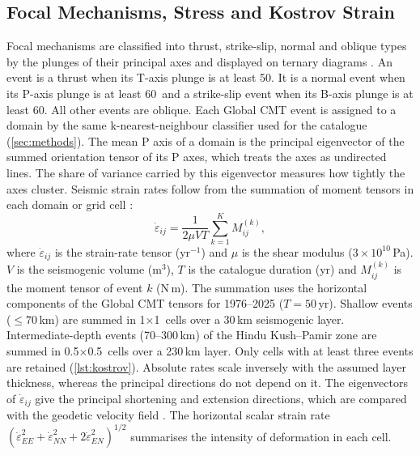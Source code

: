 \documentclass[11pt]{article}
\begin{document}
\subsection{Focal Mechanisms, Stress and Kostrov Strain}
Focal mechanisms are classified into thrust, strike-slip, normal and oblique types by
the plunges of their principal axes and displayed on ternary diagrams
\cite{Frohlich1992}. An event is a thrust when its T-axis plunge is at least
50\textdegree. It is a normal event when its P-axis plunge is at least 60\textdegree\
and a strike-slip event when its B-axis plunge is at least 60\textdegree. All other
events are oblique. Each Global CMT event is assigned to a domain by the same k-nearest-neighbour
classifier used for the catalogue (\cref{sec:methods}). The mean P axis of a domain is
the principal eigenvector of the summed orientation tensor of its P axes, which treats
the axes as undirected lines. The share of variance carried by this eigenvector
measures how tightly the axes cluster.
Seismic strain rates follow from the summation of moment tensors in each domain or
grid cell \cite{Kostrov1974, Jackson1988}:
\begin{equation}
  \dot{\varepsilon}_{ij} = \frac{1}{2\mu V T}\sum_{k=1}^{K} M_{ij}^{(k)},
  \label{eq:kostrov}
\end{equation}
where $\dot{\varepsilon}_{ij}$ is the strain-rate tensor (yr$^{-1}$) and $\mu$ is the
shear modulus ($3\times10^{10}$\,Pa). $V$ is the seismogenic volume (m$^3$), $T$ is
the catalogue duration (yr) and $M_{ij}^{(k)}$ is the moment tensor of event $k$
(N\,m). The summation uses the horizontal components of the Global CMT tensors for
1976--2025 ($T = 50$\,yr). Shallow events ($\le 70$\,km) are summed in
1\textdegree$\times$1\textdegree\ cells over a 30\,km seismogenic layer.
Intermediate-depth events (70--300\,km) of the Hindu Kush--Pamir zone are summed in
0.5\textdegree$\times$0.5\textdegree\ cells over a 230\,km layer. Only cells with
at least three events are retained (\cref{lst:kostrov}). Absolute rates scale inversely with the assumed
layer thickness, whereas the principal directions do not depend on it. The
eigenvectors of $\dot{\varepsilon}_{ij}$ give the principal shortening and extension
directions, which are compared with the geodetic velocity field
\cite{Mohadjer2010, Szeliga2012}. The horizontal scalar strain rate
$(\dot{\varepsilon}_{EE}^2 + \dot{\varepsilon}_{NN}^2 +
2\dot{\varepsilon}_{EN}^2)^{1/2}$ summarises the intensity of deformation in each
cell.
\end{document}
